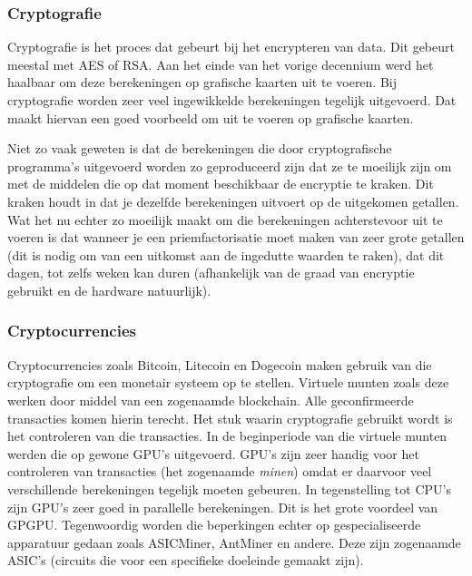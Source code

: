 \documentclass[11pt, a4paper]{article}
\begin{document}
\subsubsection{Cryptografie}

Cryptografie is het proces dat gebeurt bij het encrypteren van data. Dit gebeurt meestal met AES of RSA. Aan het einde van het vorige decennium werd het haalbaar om deze berekeningen op grafische kaarten uit te voeren. Bij cryptografie worden zeer veel ingewikkelde berekeningen tegelijk uitgevoerd. Dat maakt hiervan een goed voorbeeld om uit te voeren op grafische kaarten. 

Niet zo vaak geweten is dat de berekeningen die door cryptografische programma's uitgevoerd worden zo geproduceerd zijn dat ze te moeilijk zijn om met de middelen die op dat moment beschikbaar de encryptie te kraken.\cite{juniorcollege} Dit kraken houdt in dat je dezelfde berekeningen uitvoert op de uitgekomen getallen. Wat het nu echter zo moeilijk maakt om die berekeningen achterstevoor uit te voeren is dat wanneer je een priemfactorisatie moet maken van zeer grote getallen (dit is nodig om van een uitkomst aan de ingedutte waarden te raken), dat dit dagen, tot zelfs weken kan duren (afhankelijk van de graad van encryptie gebruikt en de hardware natuurlijk). 

\subsubsection{Cryptocurrencies} 

Cryptocurrencies zoals Bitcoin, Litecoin en Dogecoin maken gebruik van die cryptografie om een monetair systeem op te stellen. Virtuele munten zoals deze werken door middel van een zogenaamde blockchain. Alle geconfirmeerde transacties komen hierin terecht. Het stuk waarin cryptografie gebruikt wordt is het controleren van die transacties. In de beginperiode van die virtuele munten werden die op gewone GPU's uitgevoerd. GPU's zijn zeer handig voor het controleren van transacties (het zogenaamde \emph{minen}) omdat er daarvoor veel verschillende berekeningen tegelijk moeten gebeuren. In tegenstelling tot CPU's zijn GPU's zeer goed in parallelle berekeningen\cite{bitwiki}. Dit is het grote voordeel van GPGPU. Tegenwoordig worden die beperkingen echter op gespecialiseerde apparatuur gedaan zoals ASICMiner\cite{asicminer}, AntMiner\cite{antminer} en andere. Deze zijn zogenaamde ASIC's (circuits die voor een specifieke doeleinde gemaakt zijn)\cite{wikiasic}. \cite{bitcoin.org}
\end{document}
